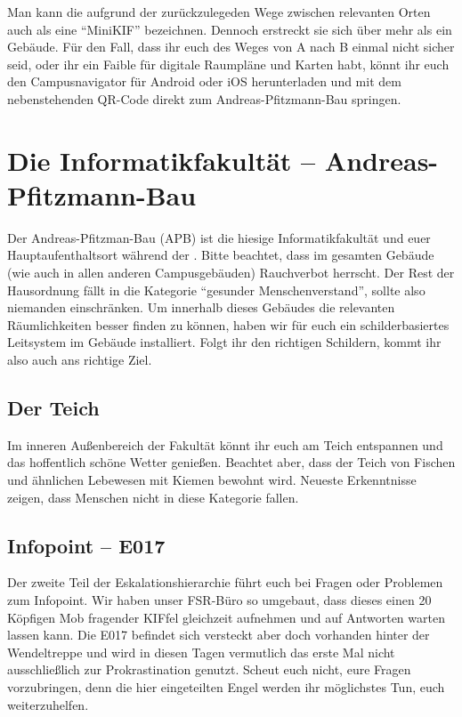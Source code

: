 
\begin{figure}
  \vspace*{-11pt}
  \textcolor{KIFgrey}{}
\end{figure}

Man kann die \KIF{} aufgrund der zurückzulegeden Wege zwischen relevanten Orten auch als eine \enquote{MiniKIF} bezeichnen. Dennoch erstreckt sie sich über mehr als ein Gebäude.
Für den Fall, dass ihr euch des Weges von A nach B einmal nicht sicher seid, oder ihr ein Faible für digitale Raumpläne und Karten habt, könnt ihr euch den Campusnavigator für Android  oder iOS  herunterladen und mit dem nebenstehenden QR-Code direkt zum Andreas-Pfitzmann-Bau springen.

\section*{Die Informatikfakultät -- Andreas-Pfitzmann-Bau}
Der Andreas-Pfitzman-Bau (APB) ist die hiesige Informatikfakultät und euer Hauptaufenthaltsort während der \KIF{}.
Bitte beachtet, dass im gesamten Gebäude (wie auch in allen anderen Campusgebäuden) Rauchverbot herrscht.
Der Rest der Hausordnung fällt in die Kategorie \enquote{gesunder Menschenverstand}, sollte also niemanden einschränken.
Um innerhalb dieses Gebäudes die relevanten Räumlichkeiten besser finden zu können, haben wir für euch ein schilderbasiertes Leitsystem im Gebäude installiert.
Folgt ihr den richtigen Schildern, kommt ihr also auch ans richtige Ziel.

\subsection*{Der Teich}
Im inneren Außenbereich der Fakultät könnt ihr euch am Teich entspannen und das hoffentlich schöne Wetter genießen.
Beachtet aber, dass der Teich von Fischen und ähnlichen Lebewesen mit Kiemen bewohnt wird.
Neueste Erkenntnisse zeigen, dass Menschen nicht in diese Kategorie fallen.

\subsection*{Infopoint -- E017}
Der zweite Teil der Eskalationshierarchie führt euch bei Fragen oder Problemen zum Infopoint.
Wir haben unser FSR-Büro so umgebaut, dass dieses einen 20 Köpfigen Mob fragender KIFfel gleichzeit aufnehmen und auf Antworten warten lassen kann.
Die E017 befindet sich versteckt aber doch vorhanden hinter der Wendeltreppe und wird in diesen Tagen vermutlich das erste Mal nicht ausschließlich zur Prokrastination genutzt.
Scheut euch nicht, eure Fragen vorzubringen, denn die hier eingeteilten Engel werden ihr möglichstes Tun, euch weiterzuhelfen.

